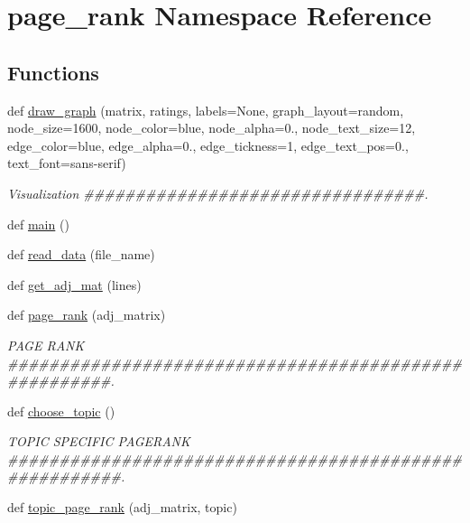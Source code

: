\hypertarget{namespacepage__rank}{}\section{page\+\_\+rank Namespace Reference}
\label{namespacepage__rank}
\subsection*{Functions}
\begin{DoxyCompactItemize}
\item 
def \hyperlink{namespacepage__rank_a0b16fcccf88cf39e3140e84693ccb629}{draw\+\_\+graph} (matrix, ratings, labels=None, graph\+\_\+layout=\textquotesingle{}random\textquotesingle{}, node\+\_\+size=1600, node\+\_\+color=\textquotesingle{}blue\textquotesingle{}, node\+\_\+alpha=0., node\+\_\+text\+\_\+size=12, edge\+\_\+color=\textquotesingle{}blue\textquotesingle{}, edge\+\_\+alpha=0., edge\+\_\+tickness=1, edge\+\_\+text\+\_\+pos=0., text\+\_\+font=\textquotesingle{}sans-\/serif\textquotesingle{})
\begin{DoxyCompactList}\small\item\em Visualization \#\#\#\#\#\#\#\#\#\#\#\#\#\#\#\#\#\#\#\#\#\#\#\#\#\#\#\#\#\#\#\#\#. \end{DoxyCompactList}\item 
def \hyperlink{namespacepage__rank_a8bd06af55f4293afdc3cc94d83cd6adc}{main} ()
\item 
def \hyperlink{namespacepage__rank_a3d99bff5a56135120f17275a221d194d}{read\+\_\+data} (file\+\_\+name)
\item 
def \hyperlink{namespacepage__rank_acefb97fa474eeb038efcbe51e2e1f4e1}{get\+\_\+adj\+\_\+mat} (lines)
\item 
def \hyperlink{namespacepage__rank_a44383b8f4c9e38856601ddb814f958e5}{page\+\_\+rank} (adj\+\_\+matrix)
\begin{DoxyCompactList}\small\item\em P\+A\+GE R\+A\+NK \#\#\#\#\#\#\#\#\#\#\#\#\#\#\#\#\#\#\#\#\#\#\#\#\#\#\#\#\#\#\#\#\#\#\#\#\#\#\#\#\#\#\#\#\#\#\#\#\#\#\#\#\#\#. \end{DoxyCompactList}\item 
def \hyperlink{namespacepage__rank_a77f7c229348c3413461ec9d7a4d8df48}{choose\+\_\+topic} ()
\begin{DoxyCompactList}\small\item\em T\+O\+P\+IC S\+P\+E\+C\+I\+F\+IC P\+A\+G\+E\+R\+A\+NK \#\#\#\#\#\#\#\#\#\#\#\#\#\#\#\#\#\#\#\#\#\#\#\#\#\#\#\#\#\#\#\#\#\#\#\#\#\#\#\#\#\#\#\#\#\#\#\#\#\#\#\#\#\#\#. \end{DoxyCompactList}\item 
def \hyperlink{namespacepage__rank_a475dd0c1857921c7fc45a6bc94958a6a}{topic\+\_\+page\+\_\+rank} (adj\+\_\+matrix, topic)
\end{DoxyCompactItemize}


